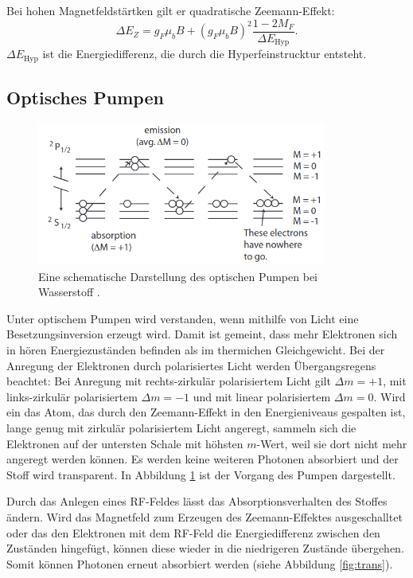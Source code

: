 \noindent Bei hohen Magnetfeldstärtken gilt er quadratische Zeemann-Effekt:
\begin{equation}
    \Delta E_Z = g_F \mu_b B +  
    \left(g_F \mu_b B \right)^2 \frac{1 -2 M_F}{\Delta E_\text{Hyp}}.
\end{equation}
\noindent $\Delta E_\text{Hyp}$ ist die Energiedifferenz,
die durch die Hyperfeinstrucktur entsteht.

\subsection{Optisches Pumpen}
\begin{figure}[h!]
    \centering
    \includegraphics[width=0.85\textwidth]{Fotos/pumpen.png}
    \caption{Eine schematische Darstellung 
    des optischen Pumpen bei Wasserstoff \cite{pumpen_caltech}.}
    \label{fig:pumpen}
\end{figure}

Unter optischem Pumpen wird verstanden,
wenn mithilfe von Licht eine Besetzungsinversion erzeugt wird.
Damit ist gemeint, 
dass mehr Elektronen sich in hören Energiezuständen befinden 
als im thermichen Gleichgewicht.
Bei der Anregung der Elektronen 
durch polarisiertes Licht werden Übergangsregens beachtet:
Bei Anregung mit rechts-zirkulär polarisiertem Licht gilt $\Delta m = +1$,
mit links-zirkulär polarisiertem $\Delta m = -1$
und mit linear polarisiertem $\Delta m = 0$.
Wird ein das Atom, 
das durch den Zeemann-Effekt in den Energieniveaus gespalten ist,
lange genug mit zirkulär polarisiertem Licht angeregt,
sammeln sich die Elektronen auf der untersten Schale mit höhsten $m$-Wert,
weil sie dort nicht mehr angeregt werden können. 
Es werden keine weiteren Photonen absorbiert 
und der Stoff wird transparent.
In Abbildung \ref{fig:pumpen} ist der Vorgang des Pumpen dargestellt.
\newline \newline

\noindent Durch das Anlegen eines RF-Feldes lässt das Absorptionsverhalten des Stoffes ändern.
Wird das Magnetfeld zum Erzeugen des Zeemann-Effektes ausgeschalltet oder das den
Elektronen mit dem RF-Feld die Energiedifferenz zwischen den Zuständen hingefügt,
können diese wieder in die niedrigeren Zustände übergehen.
Somit können Photonen erneut absorbiert werden (siehe Abbildung \ref{fig:trans}).

